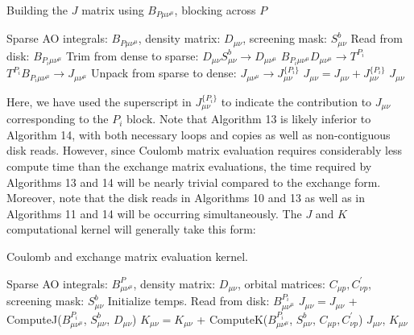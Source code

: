 \begin{algorithm}[H]
\caption{Building the $J$ matrix using $B_{P \mu \nu^\mu}$, blocking across $P$}
\begin{algorithmic}
\REQUIRE Sparse AO integrals: $B_{P \mu \nu^{\mu}}$, density matrix: $D_{\mu \nu}$, screening mask: $S_{\mu \nu}^b$
    \STATE Read from disk: $B_{P_i \mu \nu^{\mu}}$
    \STATE Trim from dense to sparse: $D_{\mu \nu}S_{\mu \nu}^b \rightarrow D_{\mu \nu^{\mu} }$
    \STATE $B_{P_i \mu\nu^{\mu}} D_{\mu \nu^{\mu}} \rightarrow T^{P_i}$
    \STATE $T^{P_i} B_{P_i \mu \nu^{\mu}} \rightarrow J_{\mu \nu^{\mu}} $
    \STATE Unpack from sparse to dense: $J_{\mu \nu^{\mu}} \rightarrow J_{\mu \nu}^{\{P_i\}}$
    \STATE $J_{\mu \nu} = J_{\mu \nu} + J_{\mu \nu}^{\{P_i\}}$
\ENDFOR
\RETURN $J_{\mu \nu}$
\end{algorithmic}
\end{algorithm}

\noindent Here, we have used the superscript in $J_{\mu \nu}^{\{P_i\}}$ to indicate the contribution to 
$J_{\mu \nu}$ corresponding to the $P_i$ block.
Note that Algorithm 13 is likely inferior to Algorithm 14, with both necessary loops and copies as well as non-contiguous disk reads.
However, since Coulomb matrix evaluation requires considerably less compute time than the exchange matrix evaluations, 
the time required by Algorithms 13 and 14 will be nearly trivial compared to the exchange form. 
Moreover, note that the disk reads in Algorithms 10 and 13 as well as 
in Algorithms 11 and 14 will be occurring simultaneously. The $J$ and $K$ computational kernel will generally take this form:

\begin{algorithm}[H]
\caption{Coulomb and exchange matrix evaluation kernel.}
\begin{algorithmic}
\REQUIRE Sparse AO integrals: $B^P_{\mu \nu^{\mu}}$, density matrix: $D_{\mu \nu}$, orbital matrices: $C_{\mu p}, C^{\prime}_{\nu p}$, screening mask: $S_{\mu \nu}^b$
\STATE Initialize temps.
    \STATE Read from disk: $B^{P_i}_{\mu \nu^{\mu}}$
    \STATE $J_{\mu \nu} = J_{\mu \nu}$ + ComputeJ($B^{P_i}_{\mu \nu^{\mu}}$, $S_{\mu \nu}^b$, $D_{\mu \nu}$)
    \STATE $K_{\mu \nu} = K_{\mu \nu}$ + ComputeK($B^{P_i}_{\mu \nu^{\mu}}$, $S_{\mu \nu}^b$, $C_{\mu p}, C^{\prime}_{\nu p}$)
\ENDFOR
\RETURN $J_{\mu \nu}$, $K_{\mu \nu}$
\end{algorithmic}
\end{algorithm}

